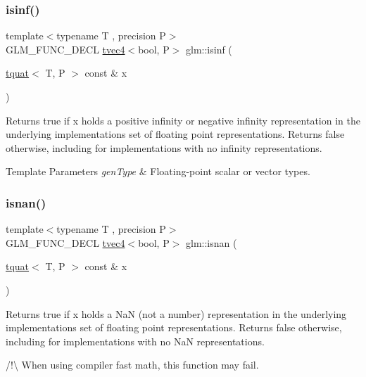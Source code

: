 \subsubsection{\texorpdfstring{isinf()}{isinf()}}
{\footnotesize\ttfamily template$<$typename T , precision P$>$ \\
G\+L\+M\+\_\+\+F\+U\+N\+C\+\_\+\+D\+E\+CL \hyperlink{structglm_1_1tvec4}{tvec4}$<$bool, P$>$ glm\+::isinf (\begin{DoxyParamCaption}\item[{\hyperlink{structglm_1_1tquat}{tquat}$<$ T, P $>$ const \&}]{x }\end{DoxyParamCaption})}

Returns true if x holds a positive infinity or negative infinity representation in the underlying implementation\textquotesingle{}s set of floating point representations. Returns false otherwise, including for implementations with no infinity representations.


\begin{DoxyTemplParams}{Template Parameters}
{\em gen\+Type} & Floating-\/point scalar or vector types. \\
\hline
\end{DoxyTemplParams}
\mbox{\label{group__gtc__quaternion_gad2fc52dd4ba5ff79cc56b3e0f9c092ed}} 
\subsubsection{\texorpdfstring{isnan()}{isnan()}}
{\footnotesize\ttfamily template$<$typename T , precision P$>$ \\
G\+L\+M\+\_\+\+F\+U\+N\+C\+\_\+\+D\+E\+CL \hyperlink{structglm_1_1tvec4}{tvec4}$<$bool, P$>$ glm\+::isnan (\begin{DoxyParamCaption}\item[{\hyperlink{structglm_1_1tquat}{tquat}$<$ T, P $>$ const \&}]{x }\end{DoxyParamCaption})}

Returns true if x holds a NaN (not a number) representation in the underlying implementation\textquotesingle{}s set of floating point representations. Returns false otherwise, including for implementations with no NaN representations.

/!\textbackslash{} When using compiler fast math, this function may fail.


